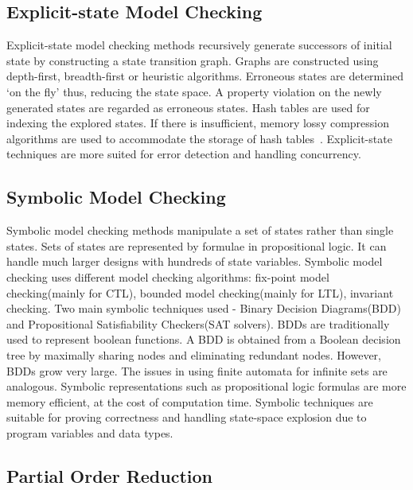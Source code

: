 \subsection{Explicit-state Model Checking}

Explicit-state model checking methods recursively generate successors of initial state by constructing a state transition graph. 
Graphs are constructed using depth-first, breadth-first or heuristic algorithms. 
Erroneous states are determined `on the fly' thus, reducing the state space. 
A property violation on the newly generated states are regarded as erroneous states. 
Hash tables are used for indexing the explored states. 
If there is insufficient, memory lossy compression algorithms are used to accommodate the storage of hash tables~\citep{d2008survey}. 
Explicit-state techniques are more suited for error detection and handling concurrency. 

\subsection{Symbolic Model Checking}

Symbolic model checking methods manipulate a set of states rather than single states. 
Sets of states are represented by formulae in propositional logic. 
It can handle much larger designs with hundreds of state variables. 
Symbolic model checking uses different model checking algorithms: fix-point model checking(mainly for CTL), bounded model checking(mainly for LTL), invariant checking. 
Two main symbolic techniques used - Binary Decision Diagrams(BDD) and Propositional Satisfiability Checkers(SAT solvers). 
BDDs are traditionally used to represent boolean functions. 
A BDD is obtained from a Boolean decision tree by maximally sharing nodes and eliminating redundant nodes. 
However, BDDs grow very large. 
The issues in using finite automata for infinite sets are analogous. 
Symbolic representations such as propositional logic formulas are more memory efficient, at the cost of computation time. 
Symbolic techniques are suitable for proving correctness and handling state-space explosion due to program variables and data types.


\subsection{Partial Order Reduction}

